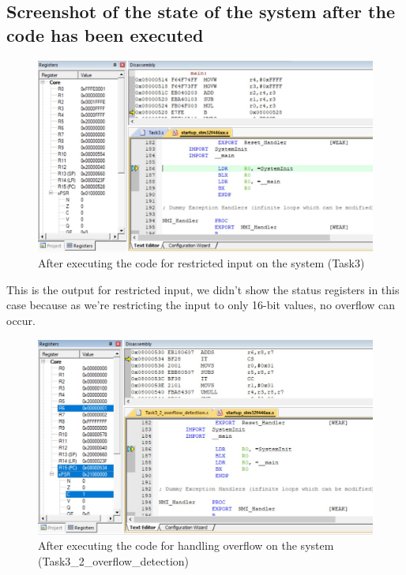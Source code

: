 \documentclass[footheight=20pt, footsepline, headheight=20pt, headsepline]{scrartcl}
\begin{document}
\subsection*{Screenshot of the state of the system after the code has been executed}
\begin{figure}[h!]
    \centering
    \includegraphics[scale=.7]{images/Task3_1After1.jpg}
    \caption{After executing the code for restricted input on the system (Task3)}
    \label{fig:after_task_three_one_one}
\end{figure}
\FloatBarrier
This is the output for restricted input, we didn't show the status registers in this case because as we're restricting the input to only 16-bit values, no overflow can occur.
\begin{figure}[ht]
    \centering
    \includegraphics[scale=.7]{images/Task3_2After1.jpg}
    \caption{After executing the code for handling overflow on the system (Task3\_2\_overflow\_detection)}
    \label{fig:after_task_three_two_one}
\end{figure}
\end{document}
